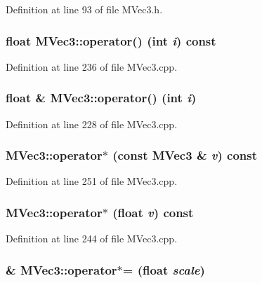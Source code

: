 Definition at line 93 of file MVec3.h.\hypertarget{class_m_vec3_6b486d03008c43722da09d73a32e3d78}{
\subsubsection[{operator()}]{\setlength{\rightskip}{0pt plus 5cm}float MVec3::operator() (int {\em i}) const}}
\label{class_m_vec3_6b486d03008c43722da09d73a32e3d78}




Definition at line 236 of file MVec3.cpp.\hypertarget{class_m_vec3_22086d981dee89e4b05ba72e7f24d113}{
\subsubsection[{operator()}]{\setlength{\rightskip}{0pt plus 5cm}float \& MVec3::operator() (int {\em i})}}
\label{class_m_vec3_22086d981dee89e4b05ba72e7f24d113}




Definition at line 228 of file MVec3.cpp.\hypertarget{class_m_vec3_dd316d1e110036f3c227ccb56e68f491}{
\subsubsection[{operator$\ast$}]{ MVec3::operator$\ast$ (const {\bf MVec3} \& {\em v}) const}}
\label{class_m_vec3_dd316d1e110036f3c227ccb56e68f491}




Definition at line 251 of file MVec3.cpp.\hypertarget{class_m_vec3_fe57dd320b5843747c718d28d0bb23ff}{
\subsubsection[{operator$\ast$}]{ MVec3::operator$\ast$ (float {\em v}) const}}
\label{class_m_vec3_fe57dd320b5843747c718d28d0bb23ff}




Definition at line 244 of file MVec3.cpp.\hypertarget{class_m_vec3_94b97a8516184efd04adb35d3407c3ff}{
\subsubsection[{operator$\ast$=}]{ \& MVec3::operator$\ast$= (float {\em scale})}}
\label{class_m_vec3_94b97a8516184efd04adb35d3407c3ff}




